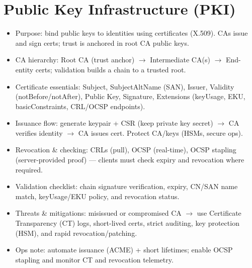 \documentclass[12pt]{article}
\begin{document}
\section{Public Key Infrastructure (PKI)}
\begin{itemize}
  \item Purpose: bind public keys to identities using certificates (X.509). CAs issue and sign certs; trust is anchored in root CA public keys.
  \item CA hierarchy: Root CA (trust anchor) $\to$ Intermediate CA(s) $\to$ End-entity certs; validation builds a chain to a trusted root.
  \item Certificate essentials: Subject, SubjectAltName (SAN), Issuer, Validity (notBefore/notAfter), Public Key, Signature, Extensions (keyUsage, EKU, basicConstraints, CRL/OCSP endpoints).
  \item Issuance flow: generate keypair + CSR (keep private key secret) $\to$ CA verifies identity $\to$ CA issues cert. Protect CA/keys (HSMs, secure ops).
  \item Revocation \& checking: CRLs (pull), OCSP (real-time), OCSP stapling (server-provided proof) --- clients must check expiry and revocation where required.
  \item Validation checklist: chain signature verification, expiry, CN/SAN name match, keyUsage/EKU policy, and revocation status.
  \item Threats \& mitigations: misissued or compromised CA $\to$ use Certificate Transparency (CT) logs, short-lived certs, strict auditing, key protection (HSM), and rapid revocation/patching.
  \item Ops note: automate issuance (ACME) + short lifetimes; enable OCSP stapling and monitor CT and revocation telemetry.
\end{itemize}

\hrulefill
\end{document}
